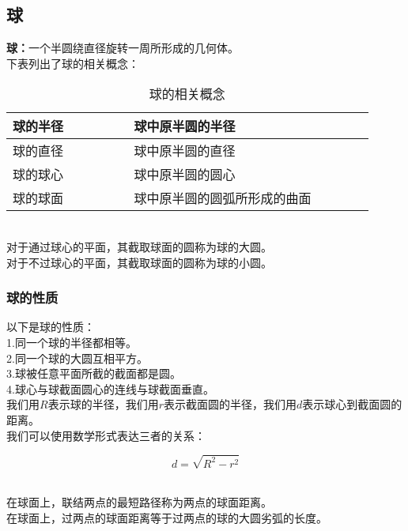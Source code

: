 \documentclass[UTF8]{ctexart}
\begin{document}
\subsection{球}
    \textbf{球：}一个半圆绕直径旋转一周所形成的几何体。\\[3mm]
    下表列出了球的相关概念：\vspace{5pt}
    \begin{table}[h]
        \begin{center}
            \begin{tabular}{l|l}
                \hline
                球的半径~~~~~~~~&球中原半圆的半径~~~~~~~~\\ \hline
                球的直径~~~~~~~~&球中原半圆的直径~~~~~~~~\\ \hline
                球的球心~~~~~~~~&球中原半圆的圆心~~~~~~~~\\ \hline
                球的球面~~~~~~~~&球中原半圆的圆弧所形成的曲面~~~~~~~~\\ \hline
            \end{tabular}
            \caption{球的相关概念}
        \end{center}
    \end{table}\\
    对于通过球心的平面，其截取球面的圆称为球的大圆。\\[3mm]
    对于不过球心的平面，其截取球面的圆称为球的小圆。\\

\subsubsection{球的性质}
    以下是球的性质：\\[3mm]
    1.同一个球的半径都相等。\\[3mm]
    2.同一个球的大圆互相平方。\\[3mm]
    3.球被任意平面所截的截面都是圆。\\[3mm]
    4.球心与球截面圆心的连线与球截面垂直。\\[6mm]
    我们用$R$表示球的半径，我们用$r$表示截面圆的半径，我们用$d$表示球心到截面圆的距离。\\[3mm]
    我们可以使用数学形式表达三者的关系：
    \begin{large}
        \begin{equation*}
            d=\sqrt{R^2-r^2}
        \end{equation*}
    \end{large}\\
    在球面上，联结两点的最短路径称为两点的球面距离。\\[3mm]
    在球面上，过两点的球面距离等于过两点的球的大圆劣弧的长度。
\end{document}
